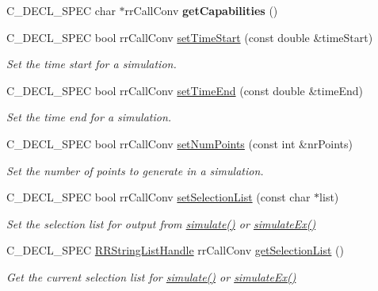 \begin{DoxyCompactItemize}
\item 
\hypertarget{group__loadsave_gaecce7b3dda3548fbe579922aadf25610}{
\-C\-\_\-\-D\-E\-C\-L\-\_\-\-S\-P\-E\-C char $\ast$rr\-Call\-Conv {\bfseries get\-Capabilities} ()}
\label{group__loadsave_gaecce7b3dda3548fbe579922aadf25610}

\item 
\-C\-\_\-\-D\-E\-C\-L\-\_\-\-S\-P\-E\-C bool rr\-Call\-Conv \hyperlink{group__loadsave_ga1a636a76ad610d99fe1c780bb3d9296d}{set\-Time\-Start} (const double \&time\-Start)
\begin{DoxyCompactList}\small\item\em \-Set the time start for a simulation. \end{DoxyCompactList}\item 
\-C\-\_\-\-D\-E\-C\-L\-\_\-\-S\-P\-E\-C bool rr\-Call\-Conv \hyperlink{group__loadsave_ga1313e21d622cd846bdd75071e965eb6c}{set\-Time\-End} (const double \&time\-End)
\begin{DoxyCompactList}\small\item\em \-Set the time end for a simulation. \end{DoxyCompactList}\item 
\-C\-\_\-\-D\-E\-C\-L\-\_\-\-S\-P\-E\-C bool rr\-Call\-Conv \hyperlink{group__loadsave_ga448ead53bb8913de664cc8ad675b4197}{set\-Num\-Points} (const int \&nr\-Points)
\begin{DoxyCompactList}\small\item\em \-Set the number of points to generate in a simulation. \end{DoxyCompactList}\item 
\-C\-\_\-\-D\-E\-C\-L\-\_\-\-S\-P\-E\-C bool rr\-Call\-Conv \hyperlink{group__loadsave_ga6465c94b6dfed39a6ef614bd0a68cb9b}{set\-Selection\-List} (const char $\ast$list)
\begin{DoxyCompactList}\small\item\em \-Set the selection list for output from \hyperlink{group__simulation_ga9f0555c11716daec2336d54d13facc57}{simulate()} or \hyperlink{group__simulation_ga9b87919e79f6eb0d7c77c3daa08d6baf}{simulate\-Ex()} \end{DoxyCompactList}\item 
\-C\-\_\-\-D\-E\-C\-L\-\_\-\-S\-P\-E\-C \hyperlink{rr__c__types_8h_abf561b014879247b7b92ee99c205de21}{\-R\-R\-String\-List\-Handle} \*
rr\-Call\-Conv \hyperlink{group__loadsave_ga1db0b86ed7fd0d6e19f8df85b7577253}{get\-Selection\-List} ()
\begin{DoxyCompactList}\small\item\em \-Get the current selection list for \hyperlink{group__simulation_ga9f0555c11716daec2336d54d13facc57}{simulate()} or \hyperlink{group__simulation_ga9b87919e79f6eb0d7c77c3daa08d6baf}{simulate\-Ex()} \end{DoxyCompactList}\item 

\end{DoxyCompactItemize}
